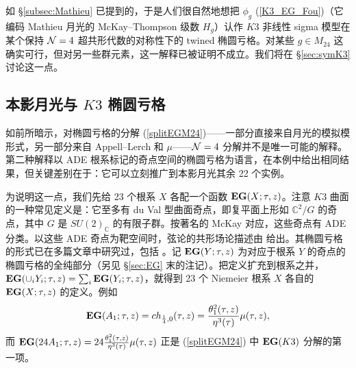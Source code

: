\documentclass[11pt,a4paper,fontset=windows]{ctexart}
\numberwithin{equation}{section}
\newcommand{\eg}{{\bf EG}}
\newcommand{\CC}{\mathbb{C}}
\newcommand{\ZZ}{\mathbb{Z}}
\def\f{\phi}
\def\m{\mu}
\def\t{\tau}
\def\th{\theta}
\newcommand{\be}{\begin{equation}}
\newcommand{\ee}{\end{equation}}
\newcommand{\eq}[1]{(\ref{#1})}
\begin{document}
如 \S\ref{subsec:Mathieu} 已提到的，于是人们很自然地想把 $\f_g$ \eq{K3_EG_Fou}（它编码 Mathieu 月光的 McKay--Thompson 级数 $H_g$）认作 $K3$ 非线性 sigma 模型在某个保持 ${\cal N}=4$ 超共形代数的对称性下的 twined 椭圆亏格。对某些 $g\in M_{24}$ 这确实可行，但对另一些群元素，这一解释已被证明不成立。我们将在 \S \ref{sec:symK3} 讨论这一点。

\subsection{本影月光与 $K3$ 椭圆亏格}
\label{sec:umK3}

如前所暗示，对椭圆亏格的分解 (\ref{splitEGM24})——一部分直接来自月光的模拟模形式，另一部分来自 Appell--Lerch 和 $\mu$——${\cal N}=4$ 分解并不是唯一可能的解释。第二种解释以 ADE 根系标记的奇点空间的椭圆亏格为语言，在本例中给出相同结果，但关键差别在于：它可以立刻推广到本影月光其余 22 个实例。


为说明这一点，我们先给 23 个根系 $X$ 各配一个函数 $\eg(X;\tau,z)$。注意 $K3$ 曲面的一种常见定义是：它至多有 du Val 型曲面奇点，即复平面上形如 $\mathbb C^2/G$ 的奇点，其中 $G$ 是 $SU(2)_{\mathbb C}$ 的有限子群。按著名的 McKay 对应，这些奇点有 ADE 分类。以这些 ADE 奇点为靶空间时，弦论的共形场论描述由 \cite{Ooguri:1995wj} 给出。其椭圆亏格的形式已在多篇文章中研究过，包括 \cite{Troost:2010ud,Eguchi:2010cb,Ashok:2011cy,Ashok:2013pya,Murthy:2013mya,Cheng:2014zpa,Harvey:2014nha}。记 $\eg(Y;\tau,z)$ 为对应于根系 $Y$ 的奇点的椭圆亏格的全纯部分（另见 \S\ref{sec:EG} 末的注记）。把定义扩充到根系之并，$\eg(\cup_i Y_i;\tau,z)= \sum_i \eg( Y_i;\tau,z)$，就得到 23 个 Niemeier 根系 $X$ 各自的 $\eg(X;\tau,z)$ 的定义。例如
\be
\eg(A_1;\tau,z) = ch_{\frac{1}{4},0}(\t,z) = \frac{\th_1^2(\t,z)}{\eta^3(\t)} \m(\t,z), 
\ee
而 $\eg(24A_1;\tau,z) = 24\frac{\th_1^2(\t,z)}{\eta^3(\t)} \m(\t,z)$ 正是 \eq{splitEGM24} 中 $\eg(K3)$ 分解的第一项。

\end{document}
